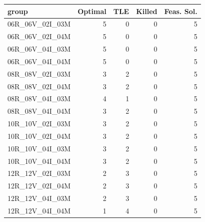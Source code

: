 
\begin{tabular}{lrrrr}
\toprule
group & Optimal & TLE & Killed & Feas. Sol.\\
\midrule
06R\_06V\_02I\_03M & 5 & 0 & 0 & 5\\
06R\_06V\_02I\_04M & 5 & 0 & 0 & 5\\
06R\_06V\_04I\_03M & 5 & 0 & 0 & 5\\
06R\_06V\_04I\_04M & 5 & 0 & 0 & 5\\
08R\_08V\_02I\_03M & 3 & 2 & 0 & 5\\
\addlinespace
08R\_08V\_02I\_04M & 3 & 2 & 0 & 5\\
08R\_08V\_04I\_03M & 4 & 1 & 0 & 5\\
08R\_08V\_04I\_04M & 3 & 2 & 0 & 5\\
10R\_10V\_02I\_03M & 3 & 2 & 0 & 5\\
10R\_10V\_02I\_04M & 3 & 2 & 0 & 5\\
\addlinespace
10R\_10V\_04I\_03M & 3 & 2 & 0 & 5\\
10R\_10V\_04I\_04M & 3 & 2 & 0 & 5\\
12R\_12V\_02I\_03M & 2 & 3 & 0 & 5\\
12R\_12V\_02I\_04M & 2 & 3 & 0 & 5\\
12R\_12V\_04I\_03M & 2 & 3 & 0 & 5\\
\addlinespace
12R\_12V\_04I\_04M & 1 & 4 & 0 & 5\\
\bottomrule
\end{tabular}
